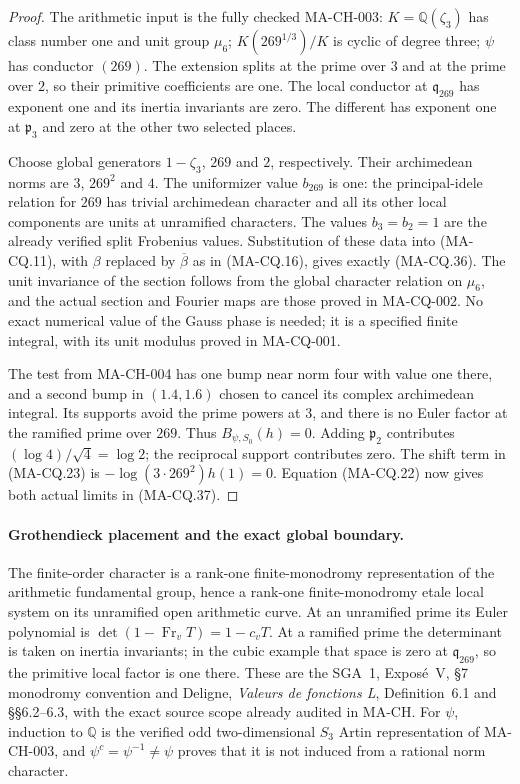 \begin{proof}
The arithmetic input is the fully checked
MA-CH-003: $K=\mathbb Q(\zeta_3)$ has class
number one and unit group $\mu_6$;
$K(269^{1/3})/K$ is cyclic of degree three;
$\psi$ has conductor $(269)$.
The extension splits at the prime over $3$
and at the prime over $2$, so their primitive
coefficients are one.  The local conductor
at $\mathfrak q_{269}$ has exponent one
and its inertia invariants are zero.
The different has exponent one at
$\mathfrak p_3$ and zero at the other
two selected places.

Choose global generators $1-\zeta_3$, $269$
and $2$, respectively.  Their archimedean
norms are $3$, $269^2$ and $4$.
The uniformizer value $b_{269}$ is one:
the principal-idele relation for $269$
has trivial archimedean character and
all its other local components are
units at unramified characters.
The values $b_3=b_2=1$ are the already
verified split Frobenius values.
Substitution of these data into
(MA-CQ.11), with $\beta$ replaced by
$\overline\beta$ as in (MA-CQ.16),
gives exactly (MA-CQ.36).
The unit invariance of the section
follows from the global character
relation on $\mu_6$, and the actual
section and Fourier maps are those
proved in MA-CQ-002.
No exact numerical value of the
Gauss phase is needed; it is a
specified finite integral, with its
unit modulus proved in MA-CQ-001.

The test from MA-CH-004 has one
bump near norm four with value one
there, and a second bump in
$(1.4,1.6)$ chosen to cancel its
complex archimedean integral.
Its supports avoid the prime
powers at $3$, and there is no
Euler factor at the ramified
prime over $269$.
Thus $B_{\psi,S_0}(h)=0$.
Adding $\mathfrak p_2$ contributes
$(\log4)/\sqrt4=\log2$;
the reciprocal support contributes
zero.  The shift term in
(MA-CQ.23) is
$-\log(3\cdot269^2)h(1)=0$.
Equation (MA-CQ.22) now gives both
actual limits in (MA-CQ.37).
\end{proof}

\paragraph{Grothendieck placement and the exact global boundary.}
The finite-order character is a rank-one finite-monodromy
representation of the arithmetic fundamental group, hence
a rank-one finite-monodromy etale local system on its
unramified open arithmetic curve.
At an unramified prime its Euler polynomial is
$\det(1-\operatorname{Fr}_vT)=1-c_vT$.
At a ramified prime the determinant is taken on inertia
invariants; in the cubic example that space is zero
at $\mathfrak q_{269}$, so the primitive local factor
is one there.
These are the SGA~1, Expos\'e~V, \S7 monodromy
convention and Deligne, \emph{Valeurs de fonctions L},
Definition~6.1 and \S\S6.2--6.3, with the exact
source scope already audited in MA-CH.
For $\psi$, induction to $\mathbb Q$ is the verified
odd two-dimensional $S_3$ Artin representation of
MA-CH-003, and $\psi^c=\psi^{-1}\ne\psi$ proves that
it is not induced from a rational norm character.

